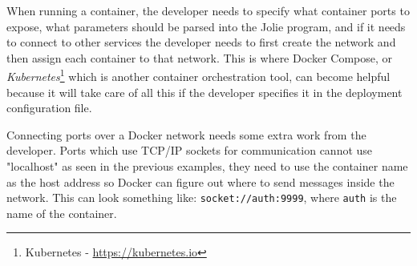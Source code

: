 When running a container, the developer needs to specify what container ports to expose, what parameters should be parsed into the Jolie program, and if it needs to connect to other services the developer needs to first create the network and then assign each container to that network.
This is where Docker Compose, or \textit{Kubernetes}\footnote{Kubernetes - \url{https://kubernetes.io}} which is another container orchestration tool, can become helpful because it will take care of all this if the developer specifies it in the deployment configuration file.

Connecting ports over a Docker network needs some extra work from the developer. Ports which use TCP/IP sockets for communication cannot use "localhost" as seen in the previous examples, they need to use the container name as the host address so Docker can figure out where to send messages inside the network.
This can look something like: \texttt{socket://auth:9999}, where \texttt{auth} is the name of the container.

